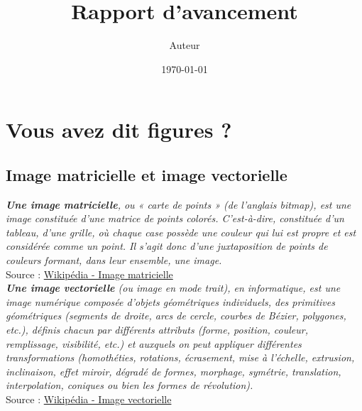 \documentclass[a4paper,12pt]{report}
\author{Auteur}
\title{Rapport d'avancement}
\date{\today}
\begin{document}
\graphicspath{{Figures/}}




\renewcommand\contentsname{Sommaire}
\setcounter{chapter}{1}
\tableofcontents



\newpage

\section{Vous avez dit figures ?}
\subsection{Image matricielle et image vectorielle}

\textit{\textbf{Une image matricielle}, ou « carte de points » (de l'anglais bitmap), est une image constituée d'une matrice de points colorés. C'est-à-dire, constituée d'un tableau, d'une grille, où chaque case possède une couleur qui lui est propre et est considérée comme un point. Il s'agit donc d'une juxtaposition de points de couleurs formant, dans leur ensemble, une image.} \\
Source : \href{https://fr.wikipedia.org/wiki/Image_matricielle}{Wikipédia - Image matricielle} \\

\textit{\textbf{Une image vectorielle} (ou image en mode trait), en informatique, est une image numérique composée d'objets géométriques individuels, des primitives géométriques (segments de droite, arcs de cercle, courbes de Bézier, polygones, etc.), définis chacun par différents attributs (forme, position, couleur, remplissage, visibilité, etc.) et auxquels on peut appliquer différentes transformations (homothéties, rotations, écrasement, mise à l'échelle, extrusion, inclinaison, effet miroir, dégradé de formes, morphage, symétrie, translation, interpolation, coniques ou bien les formes de révolution).}\\
Source : \href{https://fr.wikipedia.org/wiki/Image_vectorielle}{Wikipédia - Image vectorielle}
\end{document}
